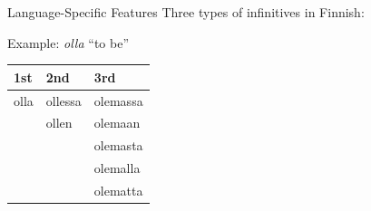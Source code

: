 \documentclass[10pt, compress, aspectratio=169]{beamer}
\begin{document}
\begin{frame}{Language-Specific Features}
Three types of infinitives in Finnish:


Example: \textit{olla} ``to be''

\begin{tabular}{l|l|l}
1st & 2nd & 3rd \\\hline
olla & ollessa & olemassa \\
& ollen & olemaan \\
& & olemasta \\
& & olemalla \\
& & olematta \\
\end{tabular}
\end{frame}
\end{document}
